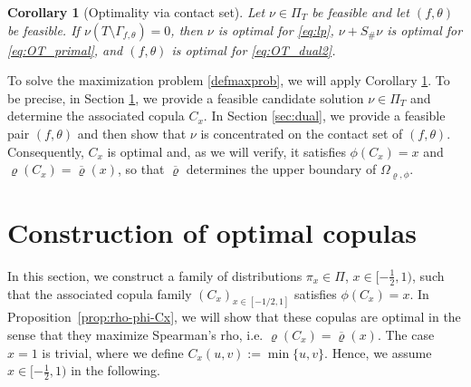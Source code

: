 \documentclass{article}
\newtheorem{corollary}[theorem]{Corollary}
\begin{document}
\begin{corollary}[Optimality via contact set]\label{cor_feas}
    Let \(\nu\in\Pi_T\) be feasible and let \((f,\theta)\) be feasible.
    If \(\nu(T\setminus\Gamma_{f,\theta})=0\), then \(\nu\) is optimal for \eqref{eq:lp}, \(\nu+S_\#\nu\) is optimal for \eqref{eq:OT_primal}, and \((f,\theta)\) is optimal for \eqref{eq:OT_dual2}.
\end{corollary}

To solve the maximization problem \eqref{defmaxprob}, we will apply Corollary \ref{cor_feas}.
To be precise, in Section \ref{sec:attain}, we provide a feasible candidate solution \(\nu\in \Pi_T\) and determine the associated copula \(C_x\).
In Section \ref{sec:dual}, we provide a feasible pair \((f,\theta)\) and then show that \(\nu\) is concentrated on the contact set of \((f,\theta)\).
Consequently, \(C_x\) is optimal and, as we will verify, it satisfies \(\phi(C_x) = x\) and \(\varrho(C_x) = \overline{\varrho}(x)\), so that \(\overline{\varrho}\) determines the upper boundary of \(\Omega_{\varrho,\phi}\).



\section{Construction of optimal copulas}\label{sec:attain}

In this section, we construct a family of distributions \(\pi_x\in \Pi\), \(x\in [-\frac 1 2, 1)\), such that the associated copula family \((C_x)_{x\in [-1/2,1]}\) satisfies \(\phi(C_x)= x\).
In Proposition~\ref{prop:rho-phi-Cx}, we will show that these copulas are optimal in the sense that they maximize Spearman's rho, i.e. \(\varrho(C_x) = \overline{\varrho}(x)\).
The case \(x=1\) is trivial, where we define \(C_x(u,v) := \min\{u,v\}\).
Hence, we assume \(x\in [-\frac 1 2,1)\) in the following.
\end{document}
